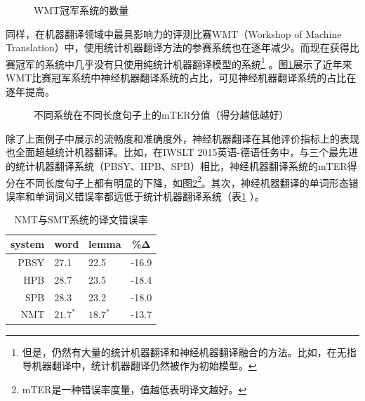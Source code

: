 \begin{figure}[htp]
\centering

\caption{WMT冠军系统的数量}
\label{fig:6-3}
\end{figure}

\parinterval  同样，在机器翻译领域中最具影响力的评测比赛WMT（Workshop of Machine Translation）中，使用统计机器翻译方法的参赛系统也在逐年减少。而现在获得比赛冠军的系统中几乎没有只使用纯统计机器翻译模型的系统\footnote{但是，仍然有大量的统计机器翻译和神经机器翻译融合的方法。比如，在无指导机器翻译中，统计机器翻译仍然被作为初始模型。} 。图\ref{fig:6-3}展示了近年来WMT比赛冠军系统中神经机器翻译系统的占比，可见神经机器翻译系统的占比在逐年提高。

\begin{figure}[htp]
\centering

\caption{不同系统在不同长度句子上的mTER分值（得分越低越好）}
\label{fig:6-4}
\end{figure}

\parinterval  除了上面例子中展示的流畅度和准确度外，神经机器翻译在其他评价指标上的表现也全面超越统计机器翻译\cite{Bentivogli2016NeuralVP}。比如，在IWSLT 2015英语-德语任务中，与三个最先进的统计机器翻译系统（PBSY、HPB、SPB）相比，神经机器翻译系统的mTER得分在不同长度句子上都有明显的下降，如图\ref{fig:6-4}\footnote{mTER是一种错误率度量，值越低表明译文越好。}。其次，神经机器翻译的单词形态错误率和单词词义错误率都远低于统计机器翻译系统（表\ref{tab:6-1} ）。

\vspace{0.5em}%
\begin{table}[htp]
\centering
\caption{NMT与SMT系统的译文错误率\cite{Bentivogli2016NeuralVP}}
\label{tab:6-1}
\begin{tabular}{r|llc}
system                    & word & lemma & \%Δ \\ \hline
PBSY                    &27.1          & 22.5           & -16.9       \\
HPB                     & 28.7          & 23.5           & -18.4       \\
SPB                     & 28.3          & 23.2           & -18.0       \\
NMT                     & $ 21.7^{\ast}$          & $18.7^{\ast}$           & -13.7      \\
\end{tabular}
\end{table}

